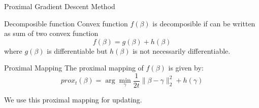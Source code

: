 \documentclass[tikz]{beamer}					%
\begin{document}
{
\begin{frame}{Proximal Gradient Descent Method}
\begin{block}{Decomposible function}
    Convex function $f(\beta)$ is decomposible if can be written as sum of two convex function
    \begin{equation}
        f(\beta) = g(\beta) + h(\beta)
    \end{equation}
    where $g(\beta)$ is differentiable but $h(\beta)$ is not necessarily differentiable.
\end{block}
\begin{block}{Proximal Mapping}
    The proximal mapping of $f(\beta)$ is given by:
    \begin{equation}
        prox_t(\beta) = \arg\min_{\gamma}\frac{1}{2t}\|\beta- \gamma \|^2_2 + h(\gamma)
    \end{equation}
\end{block}
We use this proximal mapping for updating.
\end{frame}
}
\end{document}
